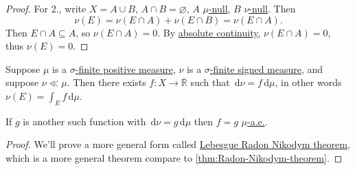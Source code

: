 \begin{proof}

	For 2., write \(X = A \cup B\), \(A \cap B = \varnothing\), \(A\) \hyperref[def:null-set-for-a-signed-measure]{\(\mu\)-null}, \(B\) \hyperref[def:null-set-for-a-signed-measure]{\(\nu\)-null}.
	Then
	\[
		\nu(E) = \nu(E \cap A) + \nu(E \cap B) = \nu(E \cap A).
	\]
	Then \(E \cap A \subseteq A\), so \(\nu(E \cap A) = 0\). By \hyperref[def:absolutely-continuous]{absolute continuity}, \(\nu(E \cap A) = 0\), thus \(\nu(E) = 0\).
\end{proof}

\begin{theorem}\label{thm:Radon-Nikodym-theorem}
	Suppose \(\mu\) is a \hyperref[def:finite-signed-measure]{\(\sigma\)-finite positive measure}, \(\nu\) is a \hyperref[def:finite-signed-measure]{\(\sigma\)-finite signed measure},
	and suppose \(\nu \ll \mu\). Then there exists \(f \colon X \to \overline{\mathbb{R}}\) such that \(\,\mathrm{d} \nu = f \,\mathrm{d} \mu\), in other words \(\nu(E) = \int_E f \,\mathrm{d} \mu\).

	If \(g\) is another such function with \(\,\mathrm{d} \nu = g \,\mathrm{d} \mu\) then \(f = g\) \hyperref[def:mu-almost-everywhere]{\(\mu\)-a.e.}.
\end{theorem}
\begin{proof}
	We'll prove a more general form called \hyperref[thm:Lebesgue-Radon-Nikodym-theorem]{Lebesgue Radon Nikodym theorem}, which is a more general
	theorem compare to \autoref{thm:Radon-Nikodym-theorem}.
\end{proof}

